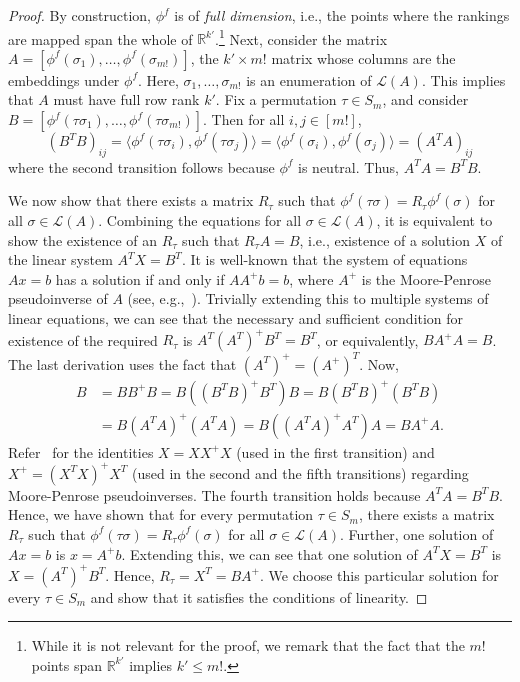 \documentclass[prodmode,acmec]{ec-acmsmall}
\newcommand{\calL}{{\mathcal{L}}}
\newcommand{\rank}{{\calL(A)}}
\begin{document}
\begin{proof}
By construction, $\phi^f$ is of \emph{full dimension}, i.e., the points where the rankings are mapped span the whole of $\mathbb{R}^{k'}$.\footnote{While it is not relevant for the proof, we remark that the fact that the $m!$ points span $\mathbb{R}^{k'}$ implies $k' \le m!$.} Next, consider the matrix $A = [\phi^f(\sigma_1), \ldots, \phi^f(\sigma_{m!})]$, the $k' \times m!$ matrix whose columns are the embeddings under $\phi^f$. Here, $\sigma_1,\ldots,\sigma_{m!}$ is an enumeration of $\rank$. This implies that $A$ must have full row rank $k'$. Fix a permutation $\tau \in S_m$, and consider $B = [\phi^f(\tau \sigma_1), \ldots, \phi^f(\tau \sigma_{m!})]$. Then for all $i,j \in [m!]$, 
$$
(B^T B)_{ij} = \langle \phi^f(\tau \sigma_i), \phi^f(\tau \sigma_j) \rangle = \langle \phi^f(\sigma_i), \phi^f(\sigma_j) \rangle = (A^T A)_{ij}
$$
where the second transition follows because $\phi^f$ is neutral. Thus, $A^T A = B^T B$.

We now show that there exists a matrix $R_{\tau}$ such that $\phi^f(\tau \sigma) = R_{\tau} \phi^f(\sigma)$ for all $\sigma \in \rank$. Combining the equations for all $\sigma \in \rank$, it is equivalent to show the existence of an $R_{\tau}$ such that $R_{\tau} A = B$, i.e., existence of a solution $X$ of the linear system $A^T X = B^T$. It is well-known that the system of equations $Ax=b$ has a solution if and only if $AA^{+}b = b$, where $A^{+}$ is the Moore-Penrose pseudoinverse of $A$ (see, e.g.,~\cite{BH12}). Trivially extending this to multiple systems of linear equations, we can see that the necessary and sufficient condition for existence of the required $R_{\tau}$ is $A^T (A^T)^{+} B^T = B^T$, or equivalently, $B A^{+} A = B$. The last derivation uses the fact that $(A^T)^{+} = (A^{+})^T$. Now, 
\begin{align*}
B &= B B^{+} B = B \left( (B^T B)^{+} B^T \right) B = B (B^T B)^{+} \left( B^T B \right) \\
&= B (A^T A)^{+} \left( A^T A \right) = B \left( (A^T A)^{+} A^T \right) A = B A^{+} A.
\end{align*}
Refer~\cite{BH12} for the identities $X = X X^{+} X$ (used in the first transition) and $X^{+} = (X^T X)^{+} X^T$ (used in the second and the fifth transitions) regarding Moore-Penrose pseudoinverses. The fourth transition holds because $A^T A = B^T B$. Hence, we have shown that for every permutation $\tau \in S_m$, there exists a matrix $R_{\tau}$ such that $\phi^f(\tau \sigma) = R_{\tau} \phi^f(\sigma)$ for all $\sigma \in \rank$. Further, one solution of $Ax=b$ is $x = A^{+}b$. Extending this, we can see that one solution of $A^T X = B^T$ is $X = (A^T)^{+} B^T$. Hence, $R_{\tau} = X^T = BA^{+}$. We choose this particular solution for every $\tau \in S_m$ and show that it satisfies the conditions of linearity. 


\end{proof}
\end{document}
